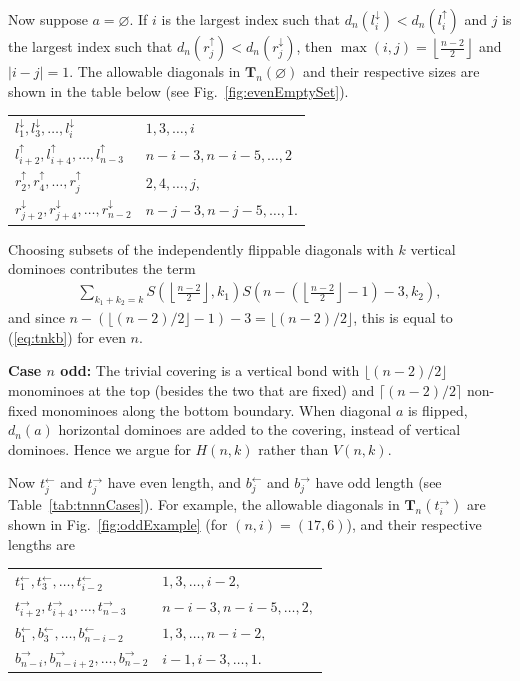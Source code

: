 \documentclass[12pt]{amsart}
\newcommand{\tabref}[1]{Table~\ref{tab:#1}}
\newcommand{\fref}[1]{Fig.~\ref{fig:#1}}
\newcommand\flr[2]{\left\lfloor \frac{#1}{#2} \right\rfloor}
\newcommand\ldown[1]{l_{#1}^\downarrow}
\newcommand\lup[1]{l_{#1}^\uparrow}
\newcommand\rdown[1]{r_{#1}^\downarrow}
\newcommand\rup[1]{r_{#1}^\uparrow}
\newcommand\tright[1]{t_{#1}^\rightarrow}
\newcommand\tleft[1]{t_{#1}^\leftarrow}
\newcommand\bright[1]{b_{#1}^\rightarrow}
\newcommand\bleft[1]{b_{#1}^\leftarrow}
\newcommand{\Tn}[1]{\mathbf T_{#1}}
\begin{document}


Now suppose $a=\varnothing$. If $i$ is the largest index such that
$d_n(\ldown{i}) < d_n(\lup{i})$ and $j$ is the largest index such that
$d_n(\rup{j}) < d_n(\rdown{j})$, then $\max(i,j) = \flr{n-2}{2}$ and
$|i-j|=1$. The allowable diagonals in $\Tn{n}(\varnothing)$ and their
respective sizes are shown in the table below (see \fref{evenEmptySet}).
\begin{center}
  \begin{tabular}{ll}
  $    \ldown{1},\ldown{3}, \ldots, \ldown{i} $&$  1,3, \ldots, i$\\
  $    \lup{i+2},\lup{i+4}, \ldots, \lup{n-3}$&$  n-i-3, n-i-5, \ldots, 2$\\
  $    \rup{2}, \rup{4}, \ldots,\rup{j}$&$  2, 4, \ldots,j,$\\
  $    \rdown{j+2}, \rdown{j+4}, \ldots,\rdown{n-2}$&$ n-j-3, n-j-5,
  \ldots,1.$
\end{tabular}
\end{center}

Choosing subsets of the independently flippable diagonals with $k$
vertical dominoes contributes the term
\begin{align*}
  \sum_{k_1+k_2 = k} S\left(\flr{n-2}{2},k_1\right)S\left(n- \left(\flr{n-2}{2}-1\right)-3,k_2\right),
\end{align*}
and since $n- \left(\lfloor (n-2)/2\rfloor-1\right)-3 = \lfloor (n-2)/2\rfloor$, this is
equal to (\ref{eq:tnkb}) for even $n$.

\textbf{Case $n$ odd:} The trivial covering is a vertical bond with
$\lfloor (n-2)/2\rfloor$ monominoes at the top (besides the two that
are fixed) and $\lceil (n-2)/2\rceil$ non-fixed monominoes along the
bottom boundary.  When diagonal $a$ is flipped, $d_n(a)$ horizontal
dominoes are added to the covering, instead of vertical dominoes.
Hence we argue for $H(n,k)$ rather than $V(n,k)$.

Now $\tleft{j}$ and $\tright{j}$ have even length, and $\bleft{j}$ and
$\bright{j}$ have odd length (see \tabref{tnnnCases}).  For example,
the allowable diagonals in $\Tn{n}(\tright{i})$ are shown in
\fref{oddExample} (for $(n,i)=(17,6)$), and their respective lengths
are

\begin{center}
\begin{tabular}{ll}
  \centering
  $    \tleft{1},\tleft{3}, \ldots, \tleft{i-2} $&$  1,3, \ldots, i-2,$\\
  $    \tright{i+2},\tright{i+4}, \ldots, \tright{n-3}$&$  n-i-3, n-i-5, \ldots, 2,$\\
  $    \bleft{1}, \bleft{3}, \ldots,\bleft{n-i-2}$&$ 1,3,\ldots,n-i-2,$\\
  $    \bright{n-i}, \bright{n-i+2}, \ldots,\bright{n-2}$&$  i-1, i-3, \ldots,1.$
\end{tabular}
\end{center}
\end{document}
